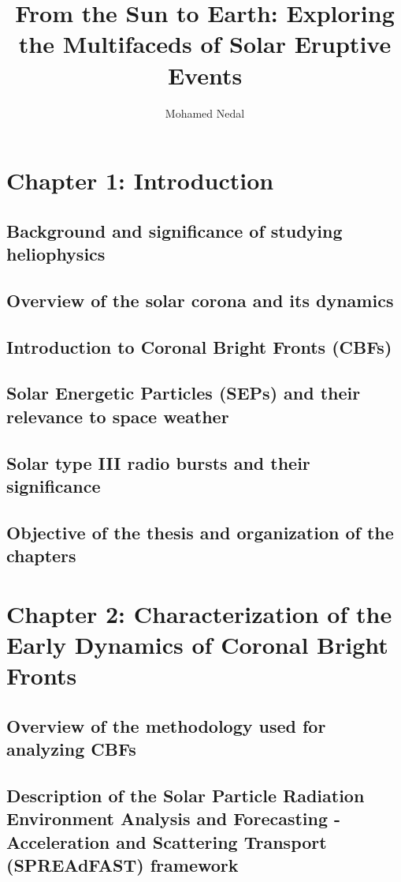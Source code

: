 \documentclass{article}
\title{From the Sun to Earth: Exploring the Multifaceds of Solar Eruptive Events}
\author{Mohamed Nedal}
\begin{document}
\maketitle
\tableofcontents

\section{Chapter 1: Introduction}



\subsection{Background and significance of studying heliophysics}
\subsection{Overview of the solar corona and its dynamics}
\subsection{Introduction to Coronal Bright Fronts (CBFs)}
\subsection{Solar Energetic Particles (SEPs) and their relevance to space weather}
\subsection{Solar type III radio bursts and their significance}
\subsection{Objective of the thesis and organization of the chapters}

\section{Chapter 2: Characterization of the Early Dynamics of Coronal Bright Fronts}
%


\subsection{Overview of the methodology used for analyzing CBFs}
\subsection{Description of the Solar Particle Radiation Environment Analysis and Forecasting - Acceleration and Scattering Transport (SPREAdFAST) framework}
\end{document}
